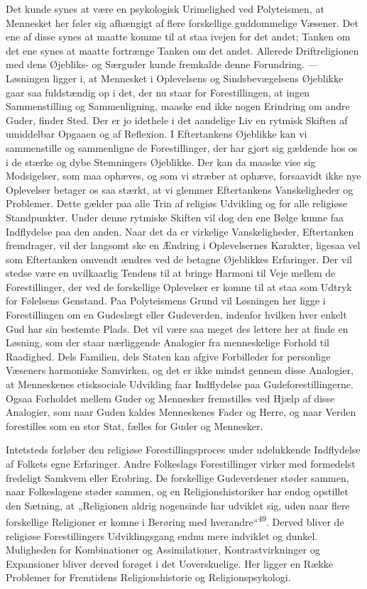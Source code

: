 \documentclass[12pt,a4paper,openany]{book}
\newcommand{\opage}[1]{\marginnote{\footnotesize\textit{[#1]}}}
\begin{document}
Det kunde synes at være en psykologisk Urimelighed ved Polyteismen, at
Mennesket her føler sig afhængigt af flere forskellige guddommelige
Væsener. Det ene af disse synes at maatte komme til at staa ivejen for
det andet; Tanken om det ene synes at maatte fortrænge Tanken om det
andet. Allerede Driftreligionen med dens Øjebliks- og Særguder kunde
fremkalde denne Forundring. --- Løsningen ligger i, at Mennesket i
Oplevelsens og Sindsbevægelsens Øjeblikke gaar saa fuldstændig op i det,
der nu staar for Forestillingen, at ingen Sammenstilling og
Sammenligning, maaske end ikke nogen Erindring om andre Guder, finder
Sted. Der er jo idethele i det aandelige Liv en rytmisk Skiften af
umiddelbar Opgaaen og af Reflexion. I Eftertankens Øjeblikke kan vi
sammenstille og sammenligne de Forestillinger, der har gjort sig
gældende hos os i de stærke og dybe Stemningers Øjeblikke. Der kan da
maaske vise sig Modsigelser, som maa ophæves, og som vi stræber at
ophæve, forsaavidt ikke nye Oplevelser betager os saa stærkt, at vi
glemmer Eftertankens Vanskeligheder og Problemer. Dette gælder paa alle
Trin af religiøs Udvikling og for alle religiøse Standpunkter. Under
denne rytmiske Skiften vil dog den ene Bølge kunne faa Indflydelse paa
den anden. Naar det da er virkelige Vanskeligheder, Eftertanken
fremdrager, vil der langsomt ske en Ændring i Oplevelsernes Karakter,
ligesaa vel som Eftertanken omvendt ændres
\opage{101}ved de betagne Øjeblikkes Erfaringer. Der vil stedse være en
uvilkaarlig Tendens til at bringe Harmoni til Veje mellem de
Forestillinger, der ved de forskellige Oplevelser er komne til at staa
som Udtryk for Følelsens Genstand. Paa Polyteismens Grund vil Løsningen
her ligge i Forestillingen om en Gudeslægt eller Gudeverden, indenfor
hvilken hver enkelt Gud har sin bestemte Plads. Det vil være saa meget
des lettere her at finde en Løsning, som der staar nærliggende Analogier
fra menneskelige Forhold til Raadighed. Dels Familien, dels Staten kan
afgive Forbilleder for personlige Væseners harmoniske Samvirken, og det
er ikke mindst gennem disse Analogier, at Menneskenes etisksociale
Udvikling faar Indflydelse paa Gudeforestillingerne. Ogsaa Forholdet
mellem Guder og Mennesker fremstilles ved Hjælp af disse Analogier, som
naar Guden kaldes Menneskenes Fader og Herre, og naar Verden forestilles
som en stor Stat, fælles for Guder og Mennesker.

Intetsteds forløber den religiøse Forestillingsproces under udelukkende
Indflydelse af Folkets egne Erfaringer. Andre Folkeslags Forestillinger
virker med formedelst fredeligt Samkvem eller Erobring. De forskellige
Gudeverdener støder sammen, naar Folkeslagene støder sammen, og en
Religionshistoriker har endog opstillet den Sætning, at „Religionen
aldrig nogensinde har udviklet sig, uden naar flere forskellige
Religioner er komne i Berøring med hverandre“\textsuperscript{49}.
Derved bliver de religiøse Forestillingers Udviklingsgang endnu mere
indviklet og dunkel. Muligheden for Kombinationer og Assimilationer,
Kontrastvirkninger og Expansioner bliver derved forøget i det
Uoverskuelige. Her ligger en Række Problemer for Fremtidens
Religionshistorie og Religionspsykologi.
\end{document}
